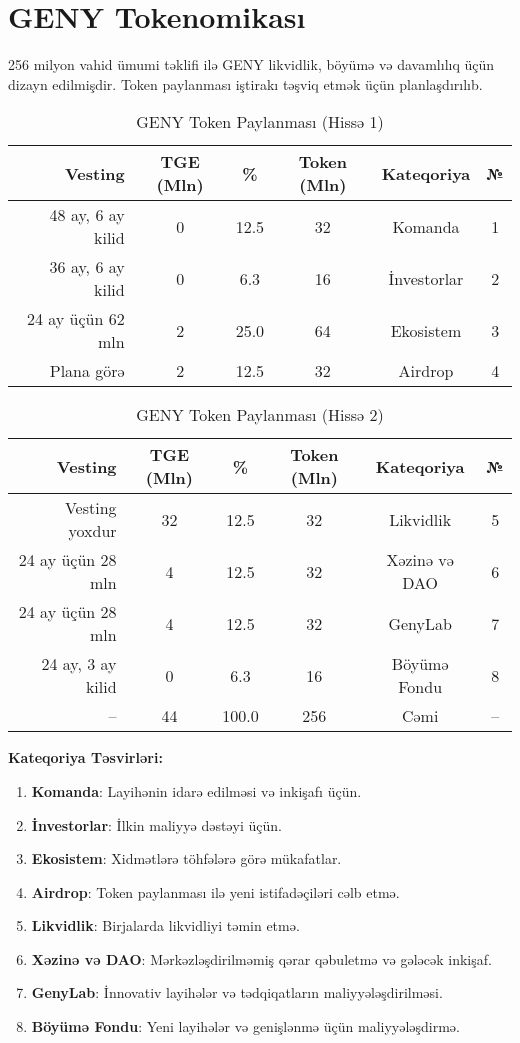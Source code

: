 \documentclass[a4paper,12pt,openany]{book}
\begin{document}
\section*{GENY Tokenomikası}
256 milyon vahid ümumi təklifi ilə GENY likvidlik, böyümə və davamlılıq üçün dizayn edilmişdir. Token paylanması iştirakı təşviq etmək üçün planlaşdırılıb.

\begin{table}[h]
\centering
\caption{GENY Token Paylanması (Hissə 1)}
\small
\begin{tabular}{r c c c c c}
\hline
\textbf{Vesting} & \textbf{TGE (Mln)} & \textbf{\%} & \textbf{Token (Mln)} & \textbf{Kateqoriya} & \textbf{№} \\
\hline
48 ay, 6 ay kilid & 0 & 12.5 & 32 & Komanda & 1 \\
36 ay, 6 ay kilid & 0 & 6.3 & 16 & İnvestorlar & 2 \\
24 ay üçün 62 mln & 2 & 25.0 & 64 & Ekosistem & 3 \\
Plana görə & 2 & 12.5 & 32 & Airdrop & 4 \\
\hline
\end{tabular}
\end{table}

\begin{table}[h]
\centering
\caption{GENY Token Paylanması (Hissə 2)}
\small
\begin{tabular}{r c c c c c}
\hline
\textbf{Vesting} & \textbf{TGE (Mln)} & \textbf{\%} & \textbf{Token (Mln)} & \textbf{Kateqoriya} & \textbf{№} \\
\hline
Vesting yoxdur & 32 & 12.5 & 32 & Likvidlik & 5 \\
24 ay üçün 28 mln & 4 & 12.5 & 32 & Xəzinə və DAO & 6 \\
24 ay üçün 28 mln & 4 & 12.5 & 32 & GenyLab & 7 \\
24 ay, 3 ay kilid & 0 & 6.3 & 16 & Böyümə Fondu & 8 \\
\hline
-- & 44 & 100.0 & 256 & Cəmi & -- \\
\hline
\end{tabular}
\end{table}

\textbf{Kateqoriya Təsvirləri:}
\begin{enumerate}
    \item \textbf{Komanda}: Layihənin idarə edilməsi və inkişafı üçün.
    \item \textbf{İnvestorlar}: İlkin maliyyə dəstəyi üçün.
    \item \textbf{Ekosistem}: Xidmətlərə töhfələrə görə mükafatlar.
    \item \textbf{Airdrop}: Token paylanması ilə yeni istifadəçiləri cəlb etmə.
    \item \textbf{Likvidlik}: Birjalarda likvidliyi təmin etmə.
    \item \textbf{Xəzinə və DAO}: Mərkəzləşdirilməmiş qərar qəbuletmə və gələcək inkişaf.
    \item \textbf{GenyLab}: İnnovativ layihələr və tədqiqatların maliyyələşdirilməsi.
    \item \textbf{Böyümə Fondu}: Yeni layihələr və genişlənmə üçün maliyyələşdirmə.
\end{enumerate}
\end{document}
